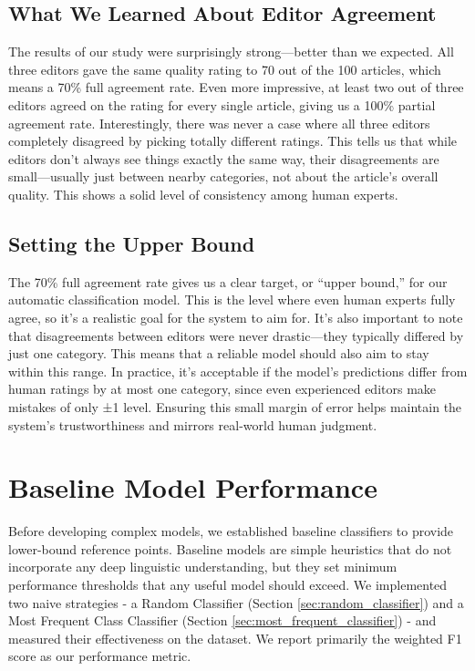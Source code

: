 \subsection{What We Learned About Editor Agreement}
The results of our study were surprisingly strong—better than we expected. All three editors gave the same quality rating to 70 out of the 100 articles, which means a 70\% full agreement rate. Even more impressive, at least two out of three editors agreed on the rating for every single article, giving us a 100\% partial agreement rate.
Interestingly, there was never a case where all three editors completely disagreed by picking totally different ratings. This tells us that while editors don't always see things exactly the same way, their disagreements are small—usually just between nearby categories, not about the article's overall quality. This shows a solid level of consistency among human experts.

\subsection{Setting the Upper Bound}
The 70\% full agreement rate gives us a clear target, or “upper bound,” for our automatic classification model. This is the level where even human experts fully agree, so it's a realistic goal for the system to aim for. It's also important to note that disagreements between editors were never drastic—they typically differed by just one category. This means that a reliable model should also aim to stay within this range. In practice, it's acceptable if the model's predictions differ from human ratings by at most one category, since even experienced editors make mistakes of only ±1 level. Ensuring this small margin of error helps maintain the system's trustworthiness and mirrors real-world human judgment.

\newpage
\section{Baseline Model Performance}
Before developing complex models, we established baseline classifiers to provide lower-bound reference points. Baseline models are simple heuristics that do not incorporate any deep linguistic understanding, but they set minimum performance thresholds that any useful model should exceed. We implemented two naive strategies - a Random Classifier (Section \ref{sec:random_classifier}) and a Most Frequent Class Classifier (Section \ref{sec:most_frequent_classifier}) - and measured their effectiveness on the dataset. We report primarily the weighted F1 score as our performance metric.

